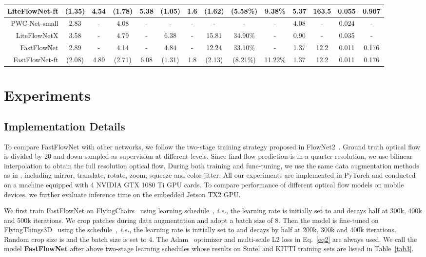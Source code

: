 \documentclass[letterpaper, 10 pt, conference]{ieeeconf}
\begin{document}
\begin{table*}[h!]
{\begin{tabular}{ r|cc|cc|cc|ccc|cc|cc }
				LiteFlowNet-ft & (1.35) & 4.54 & (1.78) & 5.38 & (1.05) & 1.6 & (1.62) & (5.58\%) & 9.38\% & 5.37 & 163.5 & 0.055 & 0.907 \\
				\hline
				PWC-Net-small & 2.83 & - & 4.08 & - & - & - & - & - & - & 4.08 & - & 0.024 & - \\
				LiteFlowNetX & 3.58 & - & 4.79 & - & 6.38 & - & 15.81 & 34.90\% & - & 0.90 & - & 0.035 & - \\
				FastFlowNet & 2.89 & - & 4.14 & - & 4.84 & - & 12.24 & 33.10\% & - & 1.37 & 12.2 & 0.011 & 0.176 \\
				FastFlowNet-ft & (2.08) & 4.89 & (2.71) & 6.08 & (1.31) & 1.8 & (2.13) & (8.21\%) & 11.22\% & 1.37 & 12.2 & 0.011 & 0.176 \\
				\hline
		\end{tabular}}
\label{tab3}
\end{table*}


\section{Experiments}
\subsection{Implementation Details}
To compare FastFlowNet with other networks, we follow the two-stage training strategy proposed in FlowNet2~\cite{Ilg_2017}. Ground truth optical flow is divided by 20 and down sampled as supervision at different levels. Since final flow prediction is in a quarter resolution, we use bilinear interpolation to obtain the full resolution optical flow. During both training and fune-tuning, we use the same data augmentation methods as in \cite{Ilg_2017}, including mirror, translate, rotate, zoom, squeeze and color jitter. All our experiments are implemented in PyTorch and conducted on a machine equipped with 4 NVIDIA GTX 1080 Ti GPU cards. To compare performance of different optical flow models on mobile devices, we further evaluate inference time 
on the embedded Jetson TX2 GPU.

We first train FastFlowNet on FlyingChairs~\cite{Fischer_2015} using  learning schedule~\cite{Ilg_2017}, \textit{i.e.}, the learning rate is initially set to  and decays half at 300k, 400k and 500k iterations. We crop  patches during data augmentation and adopt a batch size of 8. Then the model is fine-tuned on FlyingThings3D~\cite{Mayer_2016} using the  schedule~\cite{Ilg_2017}, \textit{i.e.}, the learning rate is initially set to  and decays by half at 200k, 300k and 400k iterations. Random crop size is  and the batch size is set to 4. The Adam~\cite{Adam_2014} optimizer and multi-scale L2 loss in Eq.~\ref{eq2} are always used. We call the model {\bf FastFlowNet} after above two-stage learning schedules whose results on Sintel and KITTI training sets are listed in Table~\ref{tab3}.
\end{document}
